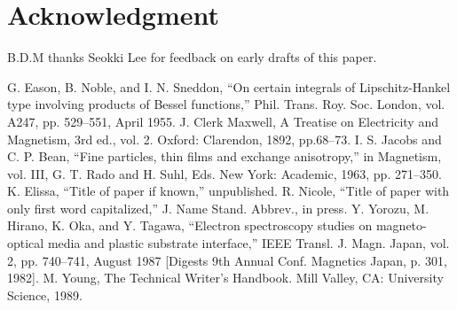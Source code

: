 \documentclass[conference]{IEEEtran}
\begin{document}
\section*{Acknowledgment}

B.D.M thanks Seokki Lee for feedback on early drafts of this paper.

\begin{thebibliography}{00}
   G. Eason, B. Noble, and I. N. Sneddon, ``On certain integrals of Lipschitz-Hankel type involving products of Bessel functions,'' Phil. Trans. Roy. Soc. London, vol. A247, pp. 529--551, April 1955.
   J. Clerk Maxwell, A Treatise on Electricity and Magnetism, 3rd ed., vol. 2. Oxford: Clarendon, 1892, pp.68--73.
   I. S. Jacobs and C. P. Bean, ``Fine particles, thin films and exchange anisotropy,'' in Magnetism, vol. III, G. T. Rado and H. Suhl, Eds. New York: Academic, 1963, pp. 271--350.
   K. Elissa, ``Title of paper if known,'' unpublished.
   R. Nicole, ``Title of paper with only first word capitalized,'' J. Name Stand. Abbrev., in press.
   Y. Yorozu, M. Hirano, K. Oka, and Y. Tagawa, ``Electron spectroscopy studies on magneto-optical media and plastic substrate interface,'' IEEE Transl. J. Magn. Japan, vol. 2, pp. 740--741, August 1987 [Digests 9th Annual Conf. Magnetics Japan, p. 301, 1982].
   M. Young, The Technical Writer's Handbook. Mill Valley, CA: University Science, 1989.
\end{thebibliography}
\end{document}
